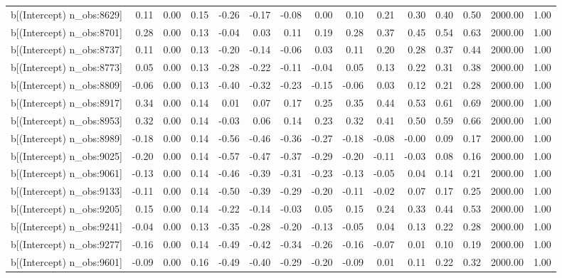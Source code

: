 \begin{table}[ht]
\begin{tabular}{rrrrrrrrrrrrrrr}
  b[(Intercept) n\_obs:8629] & 0.11 & 0.00 & 0.15 & -0.26 & -0.17 & -0.08 & 0.00 & 0.10 & 0.21 & 0.30 & 0.40 & 0.50 & 2000.00 & 1.00 \\ 
  b[(Intercept) n\_obs:8701] & 0.28 & 0.00 & 0.13 & -0.04 & 0.03 & 0.11 & 0.19 & 0.28 & 0.37 & 0.45 & 0.54 & 0.63 & 2000.00 & 1.00 \\ 
  b[(Intercept) n\_obs:8737] & 0.11 & 0.00 & 0.13 & -0.20 & -0.14 & -0.06 & 0.03 & 0.11 & 0.20 & 0.28 & 0.37 & 0.44 & 2000.00 & 1.00 \\ 
  b[(Intercept) n\_obs:8773] & 0.05 & 0.00 & 0.13 & -0.28 & -0.22 & -0.11 & -0.04 & 0.05 & 0.13 & 0.22 & 0.31 & 0.38 & 2000.00 & 1.00 \\ 
  b[(Intercept) n\_obs:8809] & -0.06 & 0.00 & 0.13 & -0.40 & -0.32 & -0.23 & -0.15 & -0.06 & 0.03 & 0.12 & 0.21 & 0.28 & 2000.00 & 1.00 \\ 
  b[(Intercept) n\_obs:8917] & 0.34 & 0.00 & 0.14 & 0.01 & 0.07 & 0.17 & 0.25 & 0.35 & 0.44 & 0.53 & 0.61 & 0.69 & 2000.00 & 1.00 \\ 
  b[(Intercept) n\_obs:8953] & 0.32 & 0.00 & 0.14 & -0.03 & 0.06 & 0.14 & 0.23 & 0.32 & 0.41 & 0.50 & 0.59 & 0.66 & 2000.00 & 1.00 \\ 
  b[(Intercept) n\_obs:8989] & -0.18 & 0.00 & 0.14 & -0.56 & -0.46 & -0.36 & -0.27 & -0.18 & -0.08 & -0.00 & 0.09 & 0.17 & 2000.00 & 1.00 \\ 
  b[(Intercept) n\_obs:9025] & -0.20 & 0.00 & 0.14 & -0.57 & -0.47 & -0.37 & -0.29 & -0.20 & -0.11 & -0.03 & 0.08 & 0.16 & 2000.00 & 1.00 \\ 
  b[(Intercept) n\_obs:9061] & -0.13 & 0.00 & 0.14 & -0.46 & -0.39 & -0.31 & -0.23 & -0.13 & -0.05 & 0.04 & 0.14 & 0.21 & 2000.00 & 1.00 \\ 
  b[(Intercept) n\_obs:9133] & -0.11 & 0.00 & 0.14 & -0.50 & -0.39 & -0.29 & -0.20 & -0.11 & -0.02 & 0.07 & 0.17 & 0.25 & 2000.00 & 1.00 \\ 
  b[(Intercept) n\_obs:9205] & 0.15 & 0.00 & 0.14 & -0.22 & -0.14 & -0.03 & 0.05 & 0.15 & 0.24 & 0.33 & 0.44 & 0.53 & 2000.00 & 1.00 \\ 
  b[(Intercept) n\_obs:9241] & -0.04 & 0.00 & 0.13 & -0.35 & -0.28 & -0.20 & -0.13 & -0.05 & 0.04 & 0.13 & 0.22 & 0.28 & 2000.00 & 1.00 \\ 
  b[(Intercept) n\_obs:9277] & -0.16 & 0.00 & 0.14 & -0.49 & -0.42 & -0.34 & -0.26 & -0.16 & -0.07 & 0.01 & 0.10 & 0.19 & 2000.00 & 1.00 \\ 
  b[(Intercept) n\_obs:9601] & -0.09 & 0.00 & 0.16 & -0.49 & -0.40 & -0.29 & -0.20 & -0.09 & 0.01 & 0.11 & 0.22 & 0.32 & 2000.00 & 1.00 \\ 

\end{tabular}
\end{table}
